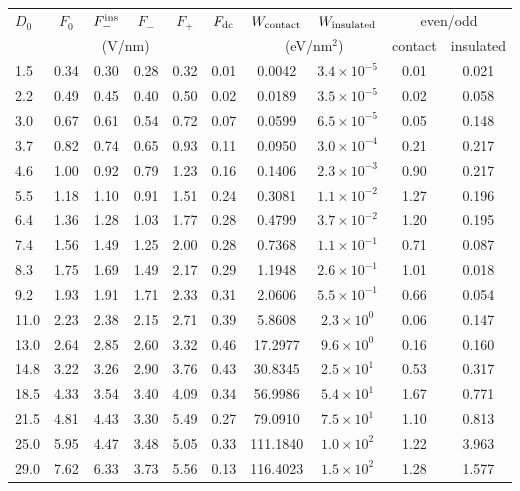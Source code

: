 \begin{tabular}{lccccccccc}
\hline\hline
$D_0$ & $F_0$ & $F_-^{\rm ins}$ & $F_-$ & $F_+$ & $F_{\rm dc}$ & $W_{\rm contact}$ & $W_{\rm insulated}$ & \multicolumn{2}{c}{even/odd} \\
\multicolumn{6}{c}{(V/nm)} & \multicolumn{2}{c}{(eV/nm$^2$)} & contact & insulated \\
\hline
1.5 & 0.34 & 0.30 & 0.28 & 0.32 & 0.01 & 0.0042 & $3.4\times10^{-5}$ & 0.01 & 0.021 \\
2.2 & 0.49 & 0.45 & 0.40 & 0.50 & 0.02 & 0.0189 & $3.5\times10^{-5}$ & 0.02 & 0.058 \\
3.0 & 0.67 & 0.61 & 0.54 & 0.72 & 0.07 & 0.0599 & $6.5\times10^{-5}$ & 0.05 & 0.148 \\
3.7 & 0.82 & 0.74 & 0.65 & 0.93 & 0.11 & 0.0950 & $3.0\times10^{-4}$ & 0.21 & 0.217 \\
4.6 & 1.00 & 0.92 & 0.79 & 1.23 & 0.16 & 0.1406 & $2.3\times10^{-3}$ & 0.90 & 0.217 \\
5.5 & 1.18 & 1.10 & 0.91 & 1.51 & 0.24 & 0.3081 & $1.1\times10^{-2}$ & 1.27 & 0.196 \\
6.4 & 1.36 & 1.28 & 1.03 & 1.77 & 0.28 & 0.4799 & $3.7\times10^{-2}$ & 1.20 & 0.195 \\
7.4 & 1.56 & 1.49 & 1.25 & 2.00 & 0.28 & 0.7368 & $1.1\times10^{-1}$ & 0.71 & 0.087 \\
8.3 & 1.75 & 1.69 & 1.49 & 2.17 & 0.29 & 1.1948 & $2.6\times10^{-1}$ & 1.01 & 0.018 \\
9.2 & 1.93 & 1.91 & 1.71 & 2.33 & 0.31 & 2.0606 & $5.5\times10^{-1}$ & 0.66 & 0.054 \\
11.0 & 2.23 & 2.38 & 2.15 & 2.71 & 0.39 & 5.8608 & $2.3\times10^{0}$ & 0.06 & 0.147 \\
13.0 & 2.64 & 2.85 & 2.60 & 3.32 & 0.46 & 17.2977 & $9.6\times10^{0}$ & 0.16 & 0.160 \\
14.8 & 3.22 & 3.26 & 2.90 & 3.76 & 0.43 & 30.8345 & $2.5\times10^{1}$ & 0.53 & 0.317 \\
18.5 & 4.33 & 3.54 & 3.40 & 4.09 & 0.34 & 56.9986 & $5.4\times10^{1}$ & 1.67 & 0.771 \\
21.5 & 4.81 & 4.43 & 3.30 & 5.49 & 0.27 & 79.0910 & $7.5\times10^{1}$ & 1.10 & 0.813 \\
25.0 & 5.95 & 4.47 & 3.48 & 5.05 & 0.33 & 111.1840 & $1.0\times10^{2}$ & 1.22 & 3.963 \\
29.0 & 7.62 & 6.33 & 3.73 & 5.56 & 0.13 & 116.4023 & $1.5\times10^{2}$ & 1.28 & 1.577 \\
\hline\hline
\end{tabular}
